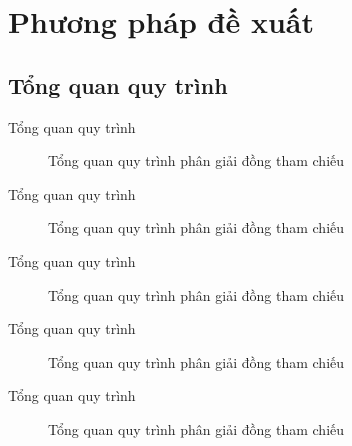 \documentclass[9pt,xcolor=table,hyperref=unicode]{beamer}
\begin{document}
	\section{Phương pháp đề xuất}
	\subsection{Tổng quan quy trình}
	\begin{frame}{Tổng quan quy trình}		
		\begin{figure}[H]
			\LARGE 
			\centering				
			\resizebox{100mm}{!}{}
			\caption{Tổng quan quy trình phân giải đồng tham chiếu}									
		\end{figure}
	\end{frame}	

	\begin{frame}{Tổng quan quy trình}		
		\begin{figure}[H]
			\LARGE 
			\centering				
			\resizebox{100mm}{!}{}
			\caption{Tổng quan quy trình phân giải đồng tham chiếu}									
		\end{figure}
	\end{frame}

	\begin{frame}{Tổng quan quy trình}		
		\begin{figure}[H]
			\LARGE 
			\centering				
			\resizebox{100mm}{!}{}
			\caption{Tổng quan quy trình phân giải đồng tham chiếu}									
		\end{figure}
	\end{frame}

	\begin{frame}{Tổng quan quy trình}		
		\begin{figure}[H]
			\LARGE 
			\centering				
			\resizebox{100mm}{!}{}
			\caption{Tổng quan quy trình phân giải đồng tham chiếu}									
		\end{figure}
	\end{frame}

	\begin{frame}{Tổng quan quy trình}		
		\begin{figure}[H]
			\LARGE 
			\centering				
			\resizebox{100mm}{!}{}
			\caption{Tổng quan quy trình phân giải đồng tham chiếu}									
		\end{figure}
	\end{frame}
\end{document}
